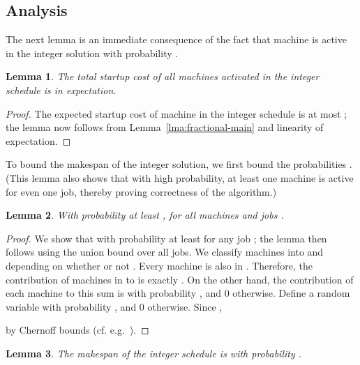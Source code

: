 \documentclass[11pt]{article}
\newtheorem{lemma}{Lemma}
\begin{document}
\subsection{Analysis}
The next lemma is an immediate consequence of the fact that machine 
 is active in the integer solution with probability
.
\begin{lemma}
\label{lma:cost-integer}
The total startup cost of all machines activated in the integer
schedule is  in expectation.
\end{lemma}
\begin{proof}
The expected startup cost of machine  in the integer schedule 
is at most ;
the lemma now follows from Lemma~\ref{lma:fractional-main} and
linearity of expectation.
\end{proof}
\noindent
To bound the makespan of the integer solution, we first bound the probabilities .
(This lemma also shows that with high probability, at least one machine is active for even
one job, thereby proving correctness of the algorithm.)
\begin{lemma}
\label{lma:open}
With probability at least ,  for all machines  and jobs .
\end{lemma}
\begin{proof}
We show that  with probability at least 
for any job ; the lemma then follows using the union bound over all jobs. 
We classify machines into  and  depending on whether or not 
. Every machine  is also in . Therefore, 
the contribution of machines in 
to  is exactly . On 
the other hand, the contribution of each machine  to this sum
is  with probability , and 0 otherwise. Define
a random variable  with probability , and 0 otherwise. 
Since ,
 
by Chernoff bounds (cf. e.g.~\cite{MotwaniR97}). 
\end{proof}
\noindent
\begin{lemma}
\label{lma:load-whp}
The makespan of the integer schedule is  with probability .
\end{lemma}
\end{document}
